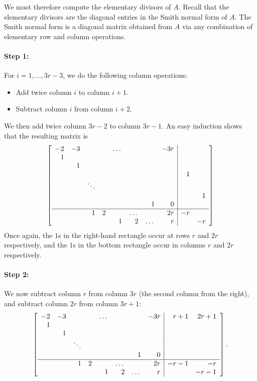 \documentclass{article}
\theoremstyle{plain}
\theoremstyle{definition}
\theoremstyle{remark}
\begin{document}
We must therefore compute the elementary divisors of $A$. Recall that the elementary divisors are the diagonal entries in the Smith normal form of $A$. The Smith normal form is a diagonal matrix obtained from $A$ via any combination of elementary row and column operations. 

\paragraph{Step 1:}
\label{sec:step-1}

For $i = 1, \dots, 3r-3$, we do the following column operations:
\begin{itemize}
    \item Add twice column $i$ to column $i+1$.
    \item Subtract column $i$ from column $i+2$.
\end{itemize}
We then add twice column $3r-2$ to column $3r-1$. An easy induction shows that the resulting matrix is
\[
\left[\begin{array}{rrrrrrrr|rr}
  -2 & -3 & & & \dots & & & -3r & & \\
  1 & & & & & & & & & \\
  & 1 & & & & & & & & \\
  & & & & & & & & 1 & \\
  & & \ddots & & & & & & & \\
  & & & & & & & & & 1 \\
  & & & & & & 1 & 0 & & \\ \hline
  & & 1 & 2 & & \dots & & 2r & -r & \\
  & & & & 1 & 2 & \dots & r & & -r
\end{array}\right]
\]
Once again, the $1$s in the right-hand rectangle occur at rows $r$ and $2r$ respectively, and the $1$s in the bottom rectangle occur in columns $r$ and $2r$ respectively.

\paragraph{Step 2:}
\label{sec:step-2}

We now subtract column $r$ from column $3r$ (the second column from the right), and subtract column $2r$ from column $3r+1$:
\[
\left[\begin{array}{rrrrrrrr|rr}
  -2 & -3 & & & \dots & & & -3r & r+1 & 2r+1 \\
  1 & & & & & & & & & \\
  & 1 & & & & & & & & \\
  & & \ddots & & & & & & & \\
  & & & & & & 1 & 0 & & \\ \hline
  & & 1 & 2 & & \dots & & 2r & -r-1 & -r \\
  & & & & 1 & 2 & \dots & r & & -r-1
\end{array}\right].
\]
\end{document}
